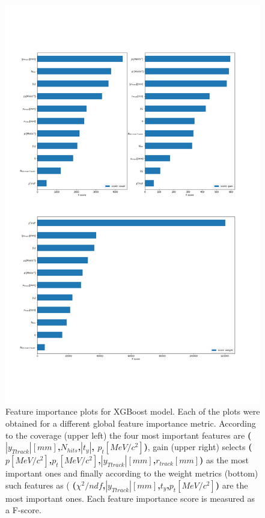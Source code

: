 \begin{figure}[!h]
\centering
\includegraphics[scale=0.8]{figures/feature_importance.png}
\caption{Feature importance plots for XGBoost model. Each of the plots were obtained for a different global feature importance metric. According to the coverage (upper left) the four most important features are \textbf{($|y_{Ttrack}|[mm]$,$N_{hits}$,$|t_{y}|$, $p_{t}[MeV \slash c^{2}]$)}, gain (upper right) selects \textbf{($p[MeV\slash c^{2}]$,$p_{t}[MeV\slash c^{2}]$,$|y_{Ttrack}|[mm]$,$r_{track}[mm]$)} as the most important ones and finally according to the weight metrics (bottom) such features as ( \textbf{($\chi^2\slash ndf$,$|y_{Ttrack}|[mm]$,$t_{y}$,$p_{t}[MeV\slash c^{2}]$)} are the most important ones. Each feature importance score is measured as a F-score. 
\label{fig:xgboost overal features importance}}
\end{figure}


